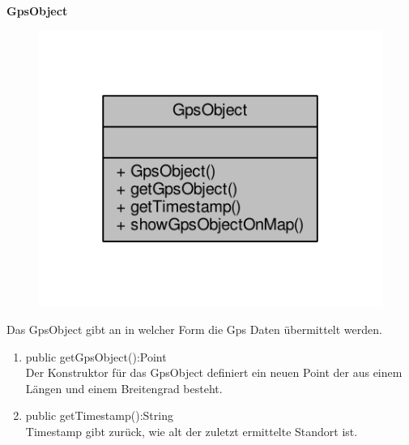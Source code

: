 \textbf{GpsObject}
\begin{figure}[H]
	\includegraphics[scale = 1]{res/umlClasses/gps_object__coll__graph.pdf}
	\centering
\end{figure}
Das GpsObject gibt an in welcher Form die Gps Daten übermittelt werden.
\begin{enumerate}
	\item public getGpsObject():Point\\
		Der Konstruktor für das GpsObject definiert ein neuen Point der aus einem Längen und einem Breitengrad besteht. 
	\item public getTimestamp():String \\
		Timestamp gibt zurück, wie alt der zuletzt ermittelte Standort ist.
\end{enumerate}

